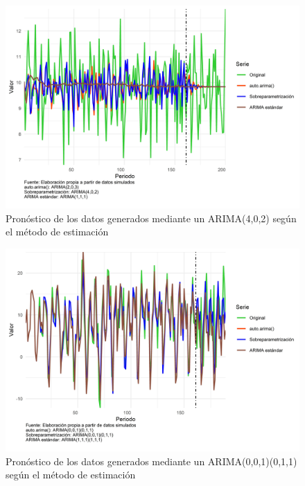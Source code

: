 \documentclass[
]{article}
\begin{document}
\begin{figure}[H]
\includegraphics[width=1\linewidth,height=1\textheight]{Tesis_files/figure-latex/pronostico_arima402-1} \caption{Pronóstico de los datos generados mediante un ARIMA(4,0,2) según el método de estimación}\label{fig:pronostico_arima402}
\end{figure}

\begin{figure}[H]
\includegraphics[width=1\linewidth,height=1\textheight]{Tesis_files/figure-latex/pronostico_arima001_011-1} \caption{Pronóstico de los datos generados mediante un ARIMA(0,0,1)(0,1,1) según el método de estimación}\label{fig:pronostico_arima001_011}
\end{figure}
\end{document}
